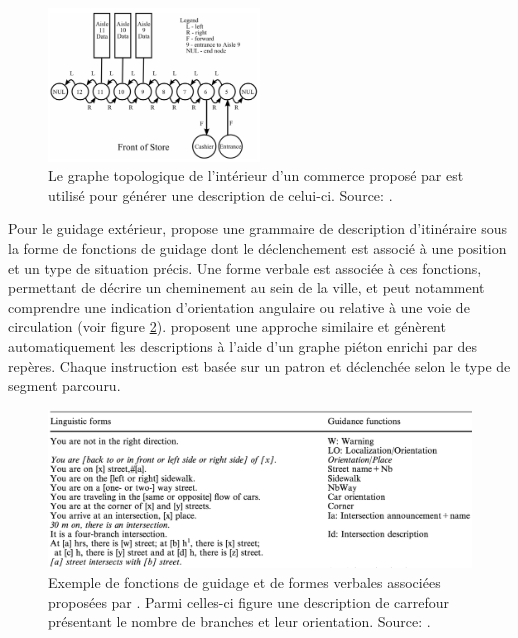 \begin{figure}[ht]
    \centering
    \includegraphics[width=0.5\textwidth]{images/etat_art/kulyukin_graph.png}
    \caption[Graphe topologique de l'intérieur d'un commerce]{Le graphe topologique de l'intérieur d'un commerce proposé par \citet{Kulyukin2008} est utilisé pour générer une description de celui-ci. Source: \citep{Kulyukin2008}.}
    \label{fig:ea_kulyukin_graph}
\end{figure}

\newpage{}

Pour le guidage extérieur, \citet{gaunet_verbal_2006} propose une grammaire de description d'itinéraire sous la forme de fonctions de guidage dont le déclenchement est associé à une position et un type de situation précis. Une forme verbale est associée à ces fonctions, permettant de décrire un cheminement au sein de la ville, et peut notamment comprendre une indication d’orientation angulaire ou relative à une voie de circulation (voir figure \ref{fig:ea_ex_desc_gaunet}). \citet{Balata2016} proposent une approche similaire et génèrent automatiquement les descriptions à l'aide d'un graphe piéton enrichi par des repères. Chaque instruction est basée sur un patron et déclenchée selon le type de segment parcouru.

\begin{figure}[ht]
    \centering
    \includegraphics[width=\textwidth]{images/etat_art/exemple_itineraire_gaunet.png}
    \caption[Exemple de description issu de la littérature]{Exemple de fonctions de guidage et de formes verbales associées proposées par \citet{gaunet_verbal_2006}. Parmi celles-ci figure une description de carrefour présentant le nombre de branches et leur orientation. Source: \citep{gaunet_verbal_2006}.}
    \label{fig:ea_ex_desc_gaunet}
\end{figure}

